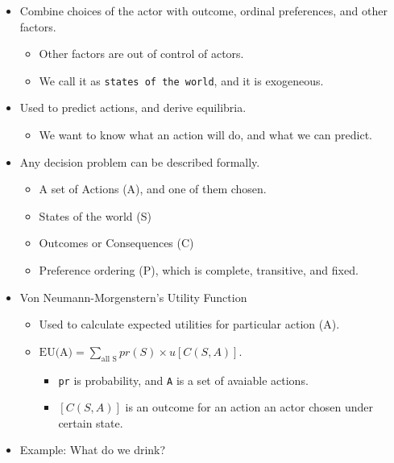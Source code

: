 \documentclass[]{book}
\providecommand{\tightlist}{%
  \setlength{\itemsep}{0pt}\setlength{\parskip}{0pt}}
\begin{document}
\begin{itemize}
\item
  Combine choices of the actor with outcome, ordinal preferences, and other factors.

  \begin{itemize}
  \tightlist
  \item
    Other factors are out of control of actors.
  \item
    We call it as \texttt{states\ of\ the\ world}, and it is exogeneous.
  \end{itemize}
\item
  Used to predict actions, and derive equilibria.

  \begin{itemize}
  \tightlist
  \item
    We want to know what an action will do, and what we can predict.
  \end{itemize}
\item
  Any decision problem can be described formally.

  \begin{itemize}
  \tightlist
  \item
    A set of Actions (A), and one of them chosen.
  \item
    States of the world (S)
  \item
    Outcomes or Consequences (C)
  \item
    Preference ordering (P), which is complete, transitive, and fixed.
  \end{itemize}
\item
  Von Neumann-Morgenstern's Utility Function

  \begin{itemize}
  \item
    Used to calculate expected utilities for particular action (A).
  \item
    \(\text{EU(A)} = \sum_{\text{all S}}pr(S)\times u[C(S, A)]\).

    \begin{itemize}
    \tightlist
    \item
      \texttt{pr} is probability, and \texttt{A} is a set of avaiable actions.
    \item
      \([C(S, A)]\) is an outcome for an action an actor chosen under certain state.
    \end{itemize}
  \end{itemize}
\item
  Example: What do we drink?


\end{itemize}
\end{document}
